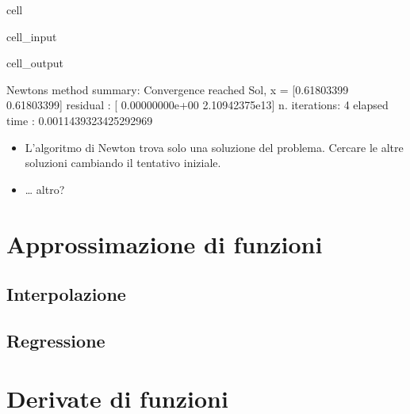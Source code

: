 \documentclass[letterpaper,10pt,italian]{jupyterBook}
\begin{document}
\begin{sphinxuseclass}{cell}
\begin{sphinxVerbatimInput}
\begin{sphinxuseclass}{cell_input}
\end{sphinxuseclass}\end{sphinxVerbatimInput}
\begin{sphinxVerbatimOutput}

\begin{sphinxuseclass}{cell_output}
\begin{sphinxVerbatim}[commandchars=\\\{\}]
Newton\PYGZsq{}s method summary: 
Convergence reached
Sol, x = [\PYGZhy{}0.61803399 \PYGZhy{}0.61803399]
residual     : [ 0.00000000e+00 \PYGZhy{}2.10942375e\PYGZhy{}13]
n. iterations: 4
elapsed time : 0.0011439323425292969
\end{sphinxVerbatim}

\end{sphinxuseclass}\end{sphinxVerbatimOutput}

\end{sphinxuseclass}\begin{itemize}
\item {} 
\sphinxAtStartPar
{} L’algoritmo di Newton trova solo una soluzione del problema. Cercare le altre soluzioni cambiando il tentativo iniziale.

\item {} 
\sphinxAtStartPar
{} … altro?

\end{itemize}

\sphinxstepscope


\chapter{Approssimazione di funzioni}
\label{\detokenize{ch/numerics/approximation:approssimazione-di-funzioni}}\label{\detokenize{ch/numerics/approximation::doc}}

\section{Interpolazione}
\label{\detokenize{ch/numerics/approximation:interpolazione}}

\section{Regressione}
\label{\detokenize{ch/numerics/approximation:regressione}}
\sphinxstepscope


\chapter{Derivate di funzioni}
\label{\detokenize{ch/numerics/derivatives:derivate-di-funzioni}}\label{\detokenize{ch/numerics/derivatives::doc}}
\end{document}

